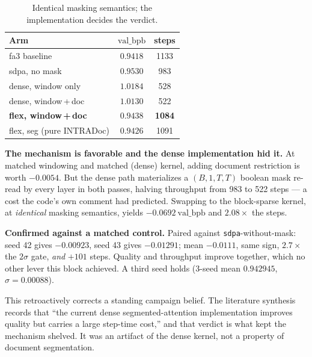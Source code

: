 \documentclass{article}
\newcommand{\valbpb}{\mathrm{val\_bpb}}
\begin{document}
\begin{table}[t]
\caption{Identical masking semantics; the implementation decides the verdict.}
\label{tab:docmask}
\vskip 0.1in
\begin{center}\begin{small}\begin{tabular}{lcc}
\toprule
Arm & $\valbpb$ & steps \\
\midrule
fa3 baseline & $0.9418$ & 1133 \\
sdpa, no mask & $0.9530$ & 983 \\
dense, window only & $1.0184$ & 528 \\
dense, window\,+\,doc & $1.0130$ & 522 \\
\textbf{flex, window\,+\,doc} & $\mathbf{0.9438}$ & \textbf{1084} \\
flex, seg (pure INTRADoc) & $0.9426$ & 1091 \\
\bottomrule
\end{tabular}\end{small}\end{center}
\vskip -0.15in
\end{table}

\textbf{The mechanism is favorable and the dense implementation hid it.} At matched windowing and matched (dense) kernel, adding document restriction is worth $-0.0054$. But the dense path materializes a $(B,1,T,T)$ boolean mask re-read by every layer in both passes, halving throughput from 983 to 522 steps --- a cost the code's own comment had predicted. Swapping to the block-sparse kernel, at \emph{identical} masking semantics, yields $-0.0692\ \valbpb$ and $2.08\times$ the steps.

\textbf{Confirmed against a matched control.} Paired against \texttt{sdpa}-without-mask: seed 42 gives $-0.00923$, seed 43 gives $-0.01291$; mean $-0.0111$, same sign, $2.7\times$ the $2\sigma$ gate, \emph{and} $+101$ steps. Quality and throughput improve together, which no other lever this block achieved. A third seed holds (3-seed mean $0.942945$, $\sigma = 0.00088$).

This retroactively corrects a standing campaign belief. The literature synthesis records that ``the current dense segmented-attention implementation improves quality but carries a large step-time cost,'' and that verdict is what kept the mechanism shelved. It was an artifact of the dense kernel, not a property of document segmentation.
\end{document}
